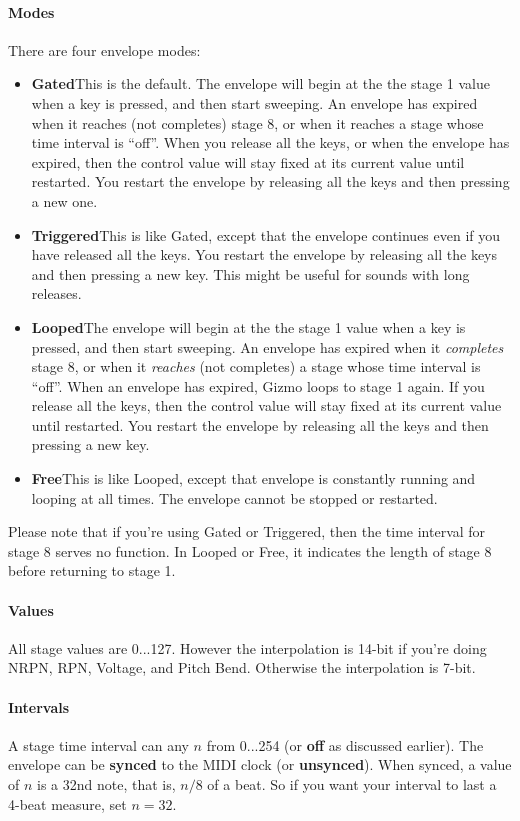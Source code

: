 \documentclass{article}
\begin{document}
\paragraph{Modes}  There are four envelope modes:

\begin{itemize}
\item {\bf Gated}\quad This is the default.  The envelope will begin at the the stage 1 value when a key is pressed, and then start sweeping.  An envelope has expired when it reaches (not completes) stage 8, or when it reaches a stage whose time interval is ``off''.  When you release all the keys, or when the envelope has expired, then the control value will stay fixed at its current value until restarted.  You restart the envelope by releasing all the keys and then pressing a new one. 
\item {\bf Triggered}\quad This is like Gated, except that the envelope continues even if you have released all the keys.  You restart the envelope by releasing all the keys and then pressing a new key.  This might be useful for sounds with long releases.
\item {\bf Looped}\quad The envelope will begin at the the stage 1 value when a key is pressed, and then start sweeping.  An envelope has expired when it {\it completes} stage 8, or when it {\it reaches} (not completes) a stage whose time interval is ``off''.  When an envelope has expired, Gizmo loops to stage 1 again.  If you release all the keys, then the control value will stay fixed at its current value until restarted.  You restart the envelope by releasing all the keys and then pressing a new key.
\item {\bf Free}\quad This is like Looped, except that envelope is constantly running and looping at all times.  The envelope cannot be stopped or restarted.
\end{itemize}

Please note that if you're using Gated or Triggered, then the time interval for stage 8 serves no function.  In Looped or Free, it indicates the length of stage 8 before returning to stage 1.  

\paragraph{Values}  All stage values are 0...127.  However the interpolation is 14-bit if you're doing NRPN, RPN, Voltage, and Pitch Bend.  Otherwise the interpolation is 7-bit.

\paragraph{Intervals} A stage time interval can any \(n\) from 0...254 (or {\bf off} as discussed earlier).  The envelope can be {\bf synced} to the MIDI clock (or {\bf unsynced}). When synced, a value of \(n\) is a 32nd note, that is, \(n/8\) of a beat.  So if you want your interval to last a 4-beat measure, set \(n=32\).
\end{document}
